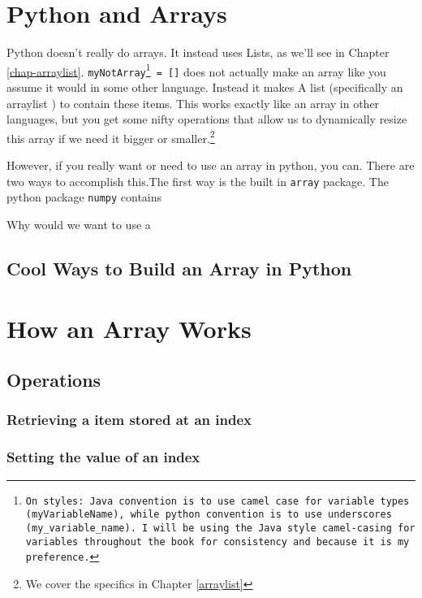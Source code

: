 \section{Python and Arrays}
\label{sec-python-arrays-lists}
Python doesn't really do arrays.
It instead uses Lists, as we'll see in Chapter \ref{chap-arraylist}.
\texttt{myNotArray\footnote{On styles:  Java convention is to use camel case for variable types (\texttt{myVariableName}), while python convention is to use underscores (\texttt{my\_variable\_name}).  I will be using the Java style camel-casing for variables throughout the book for consistency and because it is my preference.} = []} does not actually make an array like you assume it would in some other language.  Instead it makes A list (specifically an arraylist ) to contain these items.
This works exactly like an array in other languages, but you get some nifty operations that allow us to dynamically resize this array if we need it bigger or smaller.\footnote{We cover the specifics in Chapter \ref{arraylist}}



However, if you really want or need to use an array in python, you can.
There are two ways to accomplish this.The first way is the built in \texttt{array} package.    The python package \texttt{numpy} contains

Why would we want to use a 


\subsection{Cool Ways to Build an Array in Python}







\section{How an Array Works}


\subsection{Operations}

\subsubsection{Retrieving a item stored at an index}

\subsubsection{Setting the value of an index}


